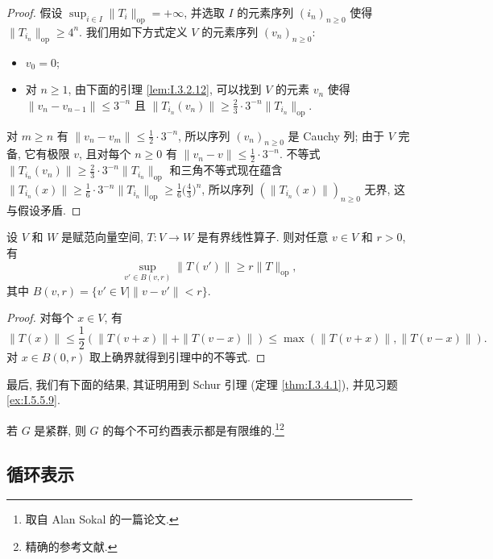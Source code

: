 \begin{proof}
假设 $\sup_{i \in I}\|T_i\|_{\mathrm{op}} = +\infty$, 并选取 $I$ 的元素序列 $(i_n)_{n \geq 0}$ 使得 $\|T_{i_n}\|_{\mathrm{op}} \geq 4^n$. 我们用如下方式定义 $V$ 的元素序列 $(v_n)_{n \geq 0}$:
\begin{itemize}
\item $v_0 = 0$;
\item 对 $n \geq 1$, 由下面的引理 \ref{lem:I.3.2.12}, 可以找到 $V$ 的元素 $v_n$ 使得 $\|v_n - v_{n-1}\| \leq 3^{-n}$ 且 $\|T_{i_n}(v_n)\| \geq \frac{2}{3} \cdot 3^{-n}\|T_{i_n}\|_{\mathrm{op}}$.
\end{itemize}
对 $m \geq n$ 有 $\|v_n - v_m\| \leq \frac{1}{2} \cdot 3^{-n}$, 所以序列 $(v_n)_{n \geq 0}$ 是 Cauchy 列; 由于 $V$ 完备, 它有极限 $v$, 且对每个 $n \geq 0$ 有 $\|v_n - v\| \leq \frac{1}{2} \cdot 3^{-n}$. 不等式 $\|T_{i_n}(v_n)\| \geq \frac{2}{3} \cdot 3^{-n}\|T_{i_n}\|_{\mathrm{op}}$ 和三角不等式现在蕴含 $\|T_{i_n}(x)\| \geq \frac{1}{6} \cdot 3^{-n}\|T_{i_n}\|_{\mathrm{op}} \geq \frac{1}{6}\bigl(\frac{4}{3}\bigr)^n$, 所以序列 $(\|T_{i_n}(x)\|)_{n \geq 0}$ 无界, 这与假设矛盾.
\end{proof}

\begin{lemma}[范数的局部下界]
\label{lem:I.3.2.12}
设 $V$ 和 $W$ 是赋范向量空间, $T \colon V \to W$ 是有界线性算子. 则对任意 $v \in V$ 和 $r > 0$, 有
\[
\sup_{v' \in B(v,r)} \|T(v')\| \geq r\|T\|_{\mathrm{op}},
\]
其中 $B(v, r) = \{v' \in V \mid \|v - v'\| < r\}$.
\end{lemma}

\begin{proof}
对每个 $x \in V$, 有
\[
\|T(x)\| \leq \frac{1}{2}(\|T(v + x)\| + \|T(v - x)\|) \leq \max(\|T(v + x)\|, \|T(v - x)\|).
\]
对 $x \in B(0, r)$ 取上确界就得到引理中的不等式.
\end{proof}

最后, 我们有下面的结果, 其证明用到 Schur 引理 (定理 \ref{thm:I.3.4.1}), 并见习题 \ref{ex:I.5.5.9}.

\begin{theorem}[紧群的不可约酉表示有限维]
\label{thm:I.3.2.13}
若 $G$ 是紧群, 则 $G$ 的每个不可约酉表示都是有限维的.\footnote{取自 Alan Sokal 的一篇论文.}\footnote{精确的参考文献.}
\end{theorem}

\subsection{循环表示}

